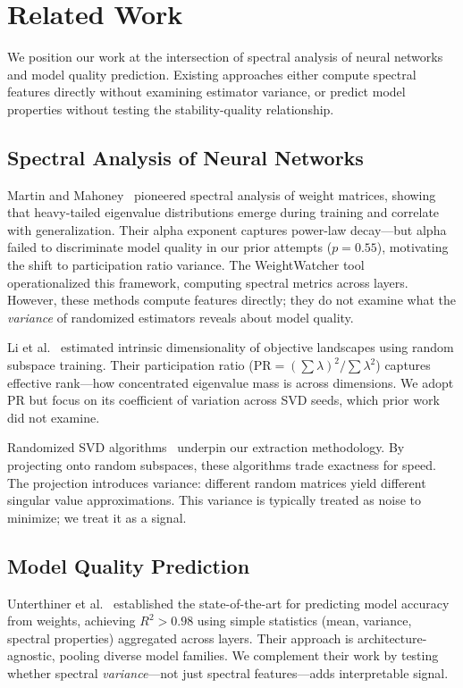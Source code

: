 \section{Related Work}
\label{sec:related}

We position our work at the intersection of spectral analysis of neural networks and model quality prediction. Existing approaches either compute spectral features directly without examining estimator variance, or predict model properties without testing the stability-quality relationship.

\subsection{Spectral Analysis of Neural Networks}

Martin and Mahoney~\cite{martin2019traditional} pioneered spectral analysis of weight matrices, showing that heavy-tailed eigenvalue distributions emerge during training and correlate with generalization. Their alpha exponent captures power-law decay---but alpha failed to discriminate model quality in our prior attempts ($p = 0.55$), motivating the shift to participation ratio variance. The WeightWatcher tool~\cite{martin2021predicting} operationalized this framework, computing spectral metrics across layers. However, these methods compute features directly; they do not examine what the \emph{variance} of randomized estimators reveals about model quality.

Li et al.~\cite{li2018measuring} estimated intrinsic dimensionality of objective landscapes using random subspace training. Their participation ratio ($\text{PR} = (\sum\lambda)^2 / \sum\lambda^2$) captures effective rank---how concentrated eigenvalue mass is across dimensions. We adopt PR but focus on its coefficient of variation across SVD seeds, which prior work did not examine.

Randomized SVD algorithms~\cite{halko2011finding} underpin our extraction methodology. By projecting onto random subspaces, these algorithms trade exactness for speed. The projection introduces variance: different random matrices yield different singular value approximations. This variance is typically treated as noise to minimize; we treat it as a signal.

\subsection{Model Quality Prediction}

Unterthiner et al.~\cite{unterthiner2020predicting} established the state-of-the-art for predicting model accuracy from weights, achieving $R^2 > 0.98$ using simple statistics (mean, variance, spectral properties) aggregated across layers. Their approach is architecture-agnostic, pooling diverse model families. We complement their work by testing whether spectral \emph{variance}---not just spectral features---adds interpretable signal.

